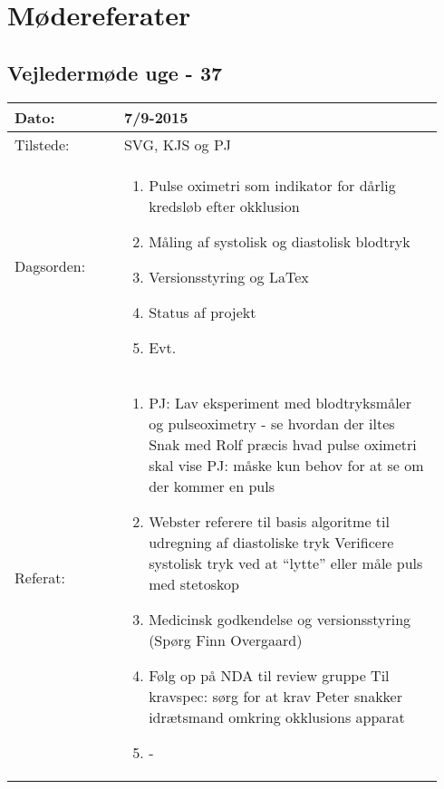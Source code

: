 \section{Mødereferater}
	\subsection{Vejledermøde uge - 37}
	\begin{longtable}{|p{0.24\linewidth}|p{0.7\linewidth}|}
		\hline
		Dato: & 7/9-2015\\ \hline
		Tilstede: & SVG, KJS og PJ \\ \hline
		Dagsorden: &
		\begin{enumerate}
			\item Pulse oximetri som indikator for dårlig kredsløb efter okklusion
			\item Måling af systolisk og diastolisk blodtryk 
			\item Versionsstyring og LaTex
			\item Status af projekt
			\item Evt.
		\end{enumerate}
		\\ \hline
		Referat: & 
		\begin{enumerate}
			\item PJ:  Lav eksperiment med blodtryksmåler og pulseoximetry - se hvordan der iltes 
			Snak med Rolf præcis hvad pulse oximetri skal vise
			PJ: måske kun behov for at se om der kommer en puls
			\item Webster referere til basis algoritme til udregning af diastoliske tryk
			Verificere systolisk tryk ved at “lytte” eller måle puls med stetoskop 
			\item Medicinsk godkendelse og versionsstyring (Spørg Finn Overgaard)
			\item Følg op på NDA til review gruppe 
			Til kravspec: sørg for at krav
			Peter snakker idrætsmand omkring okklusions apparat
			\item -
		\end{enumerate}
		\\ \hline
	\end{longtable}
	
